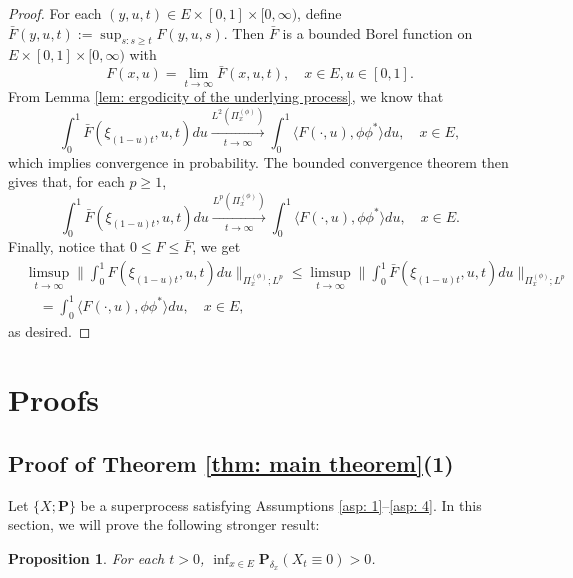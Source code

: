 \documentclass[12pt, a4paper]{amsart}
\newtheorem{prop}[thm]{Proposition}
\theoremstyle{definition}
\numberwithin{equation}{section}
\begin{document}
\begin{proof}
	For each $(y,u,t)\in E\times [0,1]\times [0,\infty)$, define $\bar F(y,u,t) := \sup_{s:s\geq t} F(y,u,s)$.
	Then $\bar F$ is a bounded Borel  function on $E\times [0,1]\times [0,\infty)$ with
\[
	F(x,u)
	= \lim_{t\to \infty} \bar F(x,u,t),
	\quad x\in E, u\in [0,1].
\]
	From Lemma \ref{lem: ergodicity of the underlying process}, we know that
\[
	\int_0^1 \bar F(\xi_{(1-u)t},u,t) du
	\xrightarrow[t\to \infty]{L^2(\Pi_x^{(\phi)})}
	\int_0^1 \langle F(\cdot , u), \phi\phi^*\rangle du,
	\quad x\in E,
\]
    which implies convergence in probability.
	The bounded convergence theorem then gives that, for each $p \geq 1$,
\[
	\int_0^1 \bar F(\xi_{(1-u)t},u,t) du
	\xrightarrow[t\to \infty]{L^p(\Pi_x^{(\phi)})}
	\int_0^1 \langle F(\cdot , u), \phi\phi^*\rangle du,
	\quad x\in E.
\]
	Finally, 
	notice that
	$0\leq F \leq \bar F$, we get
\[\begin{split}
	& \limsup_{ t \to \infty}  \Big\| \int_0^1 F(\xi_{(1-u) t },u,t) du  \Big\|_{\Pi_x^{(\phi)};L^p}
	\leq 	\limsup_{ t \to \infty}  \Big\| \int_0^1 \bar F(\xi_{(1-u) t },u,t) du  \Big\|_{\Pi_x^{(\phi)};L^p}
	\\& \quad = \int_0^1 \langle F(\cdot, u), \phi \phi^*\rangle du,
	\quad x\in E,
\end{split}\]
	as desired.
\end{proof}

\section{Proofs}
\subsection{Proof of Theorem \ref{thm: main theorem}(1)}
\label{sec: proof of result 1}
	Let $\{X; \mathbf P\}$ be a superprocess satisfying
	Assumptions \ref{asp: 1}--\ref{asp: 4}.
    In this section, we will prove the following stronger result:

\begin{prop}
\label{prop: non-presistent}
	For each $t > 0$, $\inf_{x\in E} \mathbf P_{\delta_x}(X_t \equiv 0) > 0$.
\end{prop}
\end{document}
